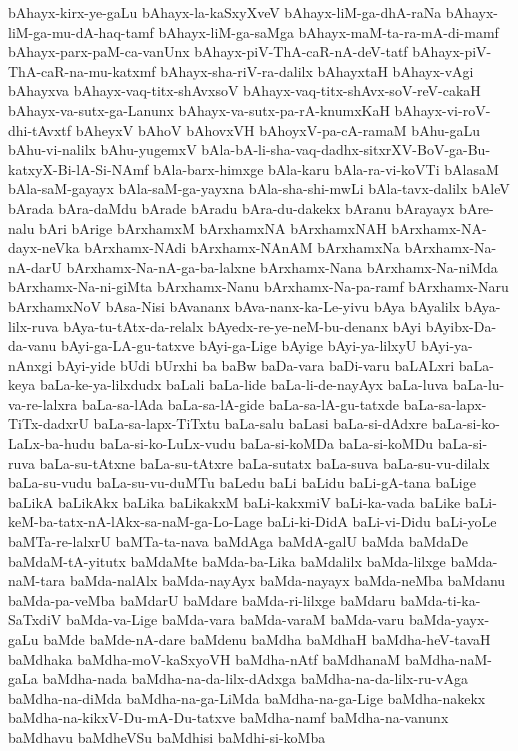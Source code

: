 {bAhayx-kirx-ye-gaLu
bAhayx-la-kaSxyXveV
bAhayx-liM-ga-dhA-raNa
bAhayx-liM-ga-mu-dA-haq-tamf
bAhayx-liM-ga-saMga
bAhayx-maM-ta-ra-mA-di-mamf
bAhayx-parx-paM-ca-vanUnx
bAhayx-piV-ThA-caR-nA-deV-tatf
bAhayx-piV-ThA-caR-na-mu-katxmf
bAhayx-sha-riV-ra-dalilx
bAhayxtaH
bAhayx-vAgi
bAhayxva
bAhayx-vaq-titx-shAvxsoV
bAhayx-vaq-titx-shAvx-soV-reV-cakaH
bAhayx-va-sutx-ga-Lanunx
bAhayx-va-sutx-pa-rA-knumxKaH
bAhayx-vi-roV-dhi-tAvxtf
bAheyxV
bAhoV
bAhovxVH
bAhoyxV-pa-cA-ramaM
bAhu-gaLu
bAhu-vi-nalilx
bAhu-yugemxV
bAla-bA-li-sha-vaq-dadhx-sitxrXV-BoV-ga-Bu-katxyX-Bi-lA-Si-NAmf
bAla-barx-himxge
bAla-karu
bAla-ra-vi-koVTi
bAlasaM
bAla-saM-gayayx
bAla-saM-ga-yayxna
bAla-sha-shi-mwLi
bAla-tavx-dalilx
bAleV
bArada
bAra-daMdu
bArade
bAradu
bAra-du-dakekx
bAranu
bArayayx
bAre-nalu
bAri
bArige
bArxhamxM
bArxhamxNA
bArxhamxNAH
bArxhamx-NA-dayx-neVka
bArxhamx-NAdi
bArxhamx-NAnAM
bArxhamxNa
bArxhamx-Na-nA-darU
bArxhamx-Na-nA-ga-ba-lalxne
bArxhamx-Nana
bArxhamx-Na-niMda
bArxhamx-Na-ni-giMta
bArxhamx-Nanu
bArxhamx-Na-pa-ramf
bArxhamx-Naru
bArxhamxNoV
bAsa-Nisi
bAvananx
bAva-nanx-ka-Le-yivu
bAya
bAyalilx
bAya-lilx-ruva
bAya-tu-tAtx-da-relalx
bAyedx-re-ye-neM-bu-denanx
bAyi
bAyibx-Da-da-vanu
bAyi-ga-LA-gu-tatxve
bAyi-ga-Lige
bAyige
bAyi-ya-lilxyU
bAyi-ya-nAnxgi
bAyi-yide
bUdi
bUrxhi
ba
baBw
baDa-vara
baDi-varu
baLALxri
baLa-keya
baLa-ke-ya-lilxdudx
baLali
baLa-lide
baLa-li-de-nayAyx
baLa-luva
baLa-lu-va-re-lalxra
baLa-sa-lAda
baLa-sa-lA-gide
baLa-sa-lA-gu-tatxde
baLa-sa-lapx-TiTx-dadxrU
baLa-sa-lapx-TiTxtu
baLa-salu
baLasi
baLa-si-dAdxre
baLa-si-ko-LaLx-ba-hudu
baLa-si-ko-LuLx-vudu
baLa-si-koMDa
baLa-si-koMDu
baLa-si-ruva
baLa-su-tAtxne
baLa-su-tAtxre
baLa-sutatx
baLa-suva
baLa-su-vu-dilalx
baLa-su-vudu
baLa-su-vu-duMTu
baLedu
baLi
baLidu
baLi-gA-tana
baLige
baLikA
baLikAkx
baLika
baLikakxM
baLi-kakxmiV
baLi-ka-vada
baLike
baLi-keM-ba-tatx-nA-lAkx-sa-naM-ga-Lo-Lage
baLi-ki-DidA
baLi-vi-Didu
baLi-yoLe
baMTa-re-lalxrU
baMTa-ta-nava
baMdAga
baMdA-galU
baMda
baMdaDe
baMdaM-tA-yitutx
baMdaMte
baMda-ba-Lika
baMdalilx
baMda-lilxge
baMda-naM-tara
baMda-nalAlx
baMda-nayAyx
baMda-nayayx
baMda-neMba
baMdanu
baMda-pa-veMba
baMdarU
baMdare
baMda-ri-lilxge
baMdaru
baMda-ti-ka-SaTxdiV
baMda-va-Lige
baMda-vara
baMda-varaM
baMda-varu
baMda-yayx-gaLu
baMde
baMde-nA-dare
baMdenu
baMdha
baMdhaH
baMdha-heV-tavaH
baMdhaka
baMdha-moV-kaSxyoVH
baMdha-nAtf
baMdhanaM
baMdha-naM-gaLa
baMdha-nada
baMdha-na-da-lilx-dAdxga
baMdha-na-da-lilx-ru-vAga
baMdha-na-diMda
baMdha-na-ga-LiMda
baMdha-na-ga-Lige
baMdha-nakekx
baMdha-na-kikxV-Du-mA-Du-tatxve
baMdha-namf
baMdha-na-vanunx
baMdhavu
baMdheVSu
baMdhisi
baMdhi-si-koMba
}
